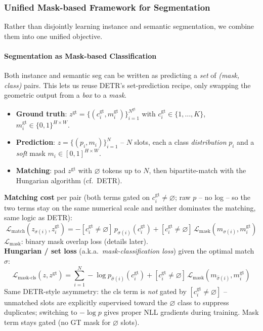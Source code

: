 \documentclass{article}
\begin{document}
\subsubsection{Unified Mask-based Framework for Segmentation}
Rather than disjointly learning instance and semantic segmentation, we combine them into one unified objective.

\paragraph{Segmentation as Mask-based Classification}
Both instance and semantic seg can be written as predicting a \textit{set} of \textit{(mask, class)} pairs. This lets us reuse DETR's set-prediction recipe, only swapping the geometric output from a \textit{box} to a \textit{mask}.
\begin{itemize}
    \item \textbf{Ground truth}: $z^\text{gt} = \{(c_i^\text{gt}, m_i^\text{gt})\}_{i=1}^{N^\text{gt}}$ with $c_i^\text{gt} \in \{1,\dots,K\}$, $m_i^\text{gt} \in \{0,1\}^{H\times W}$.
    \item \textbf{Prediction}: $z = \{(p_i, m_i)\}_{i=1}^N$ -- $N$ slots, each a class \textit{distribution} $p_i$ and a \textit{soft} mask $m_i \in [0,1]^{H\times W}$.
    \item \textbf{Matching}: pad $z^\text{gt}$ with $\varnothing$ tokens up to $N$, then bipartite-match with the Hungarian algorithm (cf.\ DETR).
\end{itemize}
\textbf{Matching cost} per pair (both terms gated on $c_i^\text{gt}\neq \varnothing$; raw $p$ -- no log -- so the two terms stay on the same numerical scale and neither dominates the matching, same logic as DETR):
$$\mathcal{L}_\text{match}(z_{\sigma(i)}, z_i^\text{gt}) = -[c_i^\text{gt}\neq\varnothing]\, p_{\sigma(i)}(c_i^\text{gt}) + [c_i^\text{gt}\neq\varnothing]\, \mathcal{L}_\text{mask}(m_{\sigma(i)}, m_i^\text{gt})$$
$\mathcal{L}_\text{mask}$: binary mask overlap loss (details later).\\

\textbf{Hungarian / set loss} (a.k.a.\ \textit{mask-classification loss}) given the optimal match $\hat\sigma$:
$$\mathcal{L}_\text{mask-cls}(z, z^\text{gt}) = \sum_{i=1}^N -\log p_{\hat\sigma(i)}(c_i^\text{gt}) + [c_i^\text{gt}\neq\varnothing]\, \mathcal{L}_\text{mask}(m_{\hat\sigma(i)}, m_i^\text{gt})$$
Same DETR-style asymmetry: the cls term is \textit{not} gated by $[c_i^\text{gt}\neq\varnothing]$ -- unmatched slots are explicitly supervised toward the $\varnothing$ class to suppress duplicates; switching to $-\log p$ gives proper NLL gradients during training. Mask term stays gated (no GT mask for $\varnothing$ slots).
\end{document}
